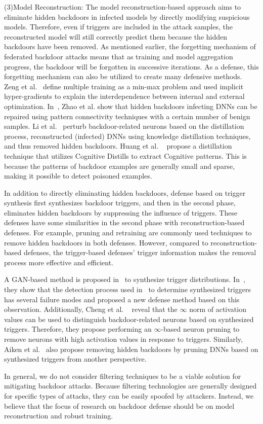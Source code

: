 (3)Model Reconstruction: The model reconstruction-based
approach aims to eliminate hidden backdoors in infected
models by directly modifying suspicious models.
Therefore, even if triggers are included in the attack
samples, the reconstructed model will still correctly predict
them because the hidden backdoors have been removed. As mentioned earlier, the forgetting mechanism of
federated backdoor attacks means that as training and
model aggregation progress, the backdoor will be forgotten
in successive iterations. As a defense, this forgetting
mechanism can also be utilized to create many defensive
methods. Zeng et al.~\cite{zeng2021adversarial} define multiple training as a min-max
problem and used implicit hyper-gradients to explain the
interdependence between internal and external optimization.
In~\cite{zhao2020bridging}, Zhao et al. show that hidden backdoors
infecting DNNs can be repaired using pattern connectivity
techniques with a certain number of benign samples. Li et al.~\cite{yoshida2020disabling} perturb backdoor-related neurons based
on the distillation process, reconstructed (infected) DNNs
using knowledge distillation techniques, and
thus removed hidden backdoors. Huang et al. ~\cite{huang2023distilling} propose a
distillation technique that utilizes Cognitive Distills to
extract Cognitive patterns. This is because the patterns of
backdoor examples are generally small and sparse, making
it possible to detect poisoned examples.  

In addition to directly eliminating hidden backdoors,
defense based on trigger synthesis first synthesizes
backdoor triggers, and then in the second phase, eliminates
hidden backdoors by suppressing the influence of triggers.
These defenses have some similarities in the second phase
with reconstruction-based defenses. For example, pruning
and retraining are commonly used techniques to remove
hidden backdoors in both defenses. However, compared to
reconstruction-based defenses, the trigger-based defenses'
trigger information makes the removal process more effective and eﬀicient.  

A GAN-based method is proposed in~\cite{zhu2020gangsweep} to synthesize
trigger distributions. In~\cite{guo2020towards}, they show that the detection
process used in~\cite{wang2019neural} to determine synthesized triggers has
several failure modes and proposed a new defense method
based on this observation. Additionally, Cheng et al. ~\cite{xu2020defending}
reveal that the $\infty$ norm of activation values can be used to
distinguish backdoor-related neurons based on synthesized
triggers. Therefore, they propose performing an $\infty$-based
neuron pruning to remove neurons with high activation
values in response to triggers. Similarly, Aiken et al.~\cite{aiken2021neural} 
also propose removing hidden backdoors by pruning DNNs
based on synthesized triggers from another perspective. 

In general, we do not consider filtering techniques to be
a viable solution for mitigating backdoor attacks. Because
filtering technologies are generally designed for specific
types of attacks, they can be easily spoofed by attackers.
Instead, we believe that the focus of research on backdoor
defense should be on model reconstruction and robust
training.